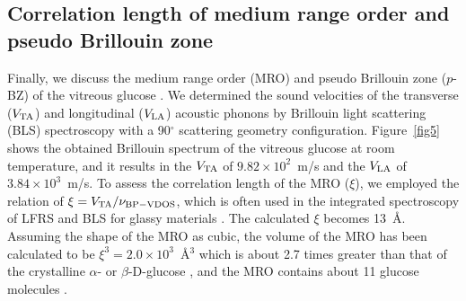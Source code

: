 \documentclass[%
 reprint,
superscriptaddress,
 amsmath,amssymb,
 aps,
prb,
]{revtex4-1}
\begin{document}
\subsection{Correlation length of medium range order and pseudo Brillouin zone}


Finally, we discuss the medium range order (MRO) and pseudo Brillouin zone ($p$-BZ) of the vitreous glucose \cite{Violini2012}. We determined the sound velocities of the transverse ($V_{\rm TA}$) and  longitudinal ($V_{\rm LA}$) acoustic phonons by Brillouin light scattering (BLS) spectroscopy with a 90$^\circ$ scattering geometry configuration. Figure~\ref{fig5} shows the obtained Brillouin spectrum of the vitreous glucose at room temperature, and it results in the $V_{\rm TA}$ of $9.82 \times 10^{2}$~m/s and the $V_{\rm LA}$ of $3.84 \times 10^{3}$~m/s.
To assess the correlation length of the MRO ($\xi$), we employed the relation of $\xi = V_{\rm TA}/\nu_{\rm BP-VDOS}$, which is often used in the integrated spectroscopy of LFRS and BLS for glassy materials \cite{Duval1990, Surovtsev2002}. The calculated $\xi$ becomes 13~\AA. Assuming the shape of the MRO as cubic, the volume of the MRO has been calculated to be $\xi^{3} = 2.0 \times 10^{3}$~\AA$^3$ which is about 2.7 times greater than that of the crystalline $\alpha$- or $\beta$-D-glucose \cite{Brown1979, Chu1968}, and the MRO contains about 11 glucose molecules \cite{Parks1928}.
\end{document}
